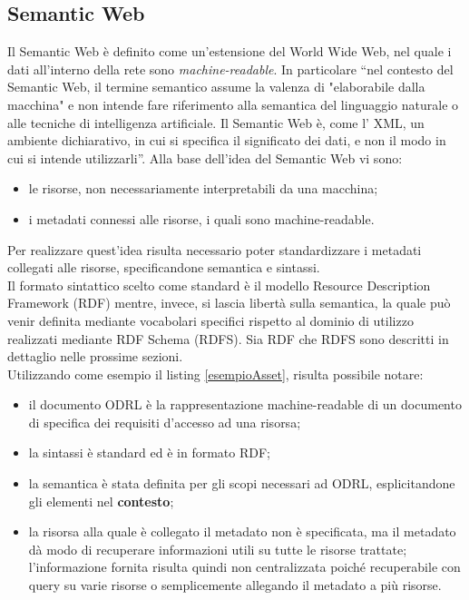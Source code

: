 \documentclass[12pt,a4paper,twoside]{book}
\begin{document}
\subsection{Semantic Web}
Il Semantic Web è definito come un'estensione del World Wide Web, nel quale i dati all'interno della rete sono \textit{machine-readable}. In particolare ``nel contesto del Semantic Web, il termine semantico assume la valenza di
"elaborabile dalla macchina" e non intende fare riferimento alla semantica del 
linguaggio naturale o alle tecniche di intelligenza artificiale. Il Semantic Web è, come l’
XML, un ambiente dichiarativo, in cui si specifica il significato dei dati, e non il modo
in cui si intende utilizzarli''\cite{introSem}. Alla base dell'idea del Semantic Web vi sono:
\begin{itemize}
	\item le risorse, non necessariamente interpretabili da una macchina;
	\item i metadati connessi alle risorse, i quali sono machine-readable.
\end{itemize}
Per realizzare quest'idea risulta necessario poter standardizzare i metadati collegati alle risorse, specificandone semantica e sintassi.\\
Il formato sintattico scelto come standard è il modello Resource Description Framework (RDF)\cite{RDF} mentre, invece, si lascia libertà sulla semantica, la quale può venir definita mediante vocabolari specifici rispetto al dominio di utilizzo realizzati mediante RDF Schema (RDFS)\cite{RDFS}. Sia RDF che RDFS sono descritti in dettaglio nelle prossime sezioni.\\
Utilizzando come esempio il listing \ref{esempioAsset}, risulta possibile notare:
\begin{itemize}
	\item il documento ODRL è la rappresentazione machine-readable di un documento di specifica dei requisiti d'accesso ad una risorsa;
	\item la sintassi è standard ed è in formato RDF;
	\item la semantica è stata definita per gli scopi necessari ad ODRL, esplicitandone gli elementi nel \textbf{contesto};
	\item la risorsa alla quale è collegato il metadato non è specificata, ma il metadato dà modo di recuperare informazioni utili su tutte le risorse trattate; l'informazione fornita risulta quindi non centralizzata poiché recuperabile con query su varie risorse o semplicemente allegando il metadato a più risorse.
\end{itemize}
\end{document}
